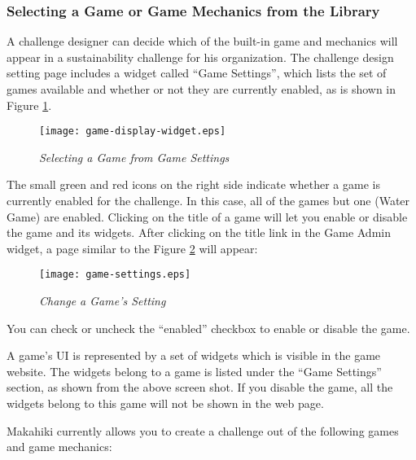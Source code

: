 \subsubsection{Selecting a Game or Game Mechanics from the Library}
A challenge designer can decide which of the built-in game and mechanics will appear in a sustainability challenge for his organization. The challenge design setting page includes a widget called ``Game Settings'', which lists the set of games available and whether or not they are currently enabled, as is shown in Figure \ref{fig:game-display-widget}.

\begin{figure}[!ht]
  \center
  \texttt{[image: game-display-widget.eps]}
  \caption{\em Selecting a Game from Game Settings}
  \label{fig:game-display-widget}
\end{figure}

The small green and red icons on the right side indicate whether a game is currently enabled for the challenge. In this case, all of the games but one (Water Game) are enabled. Clicking on the title of a game will let you enable or disable the game and its widgets. After clicking on the title link in the Game Admin widget, a page similar to the Figure \ref{fig:game-settings} will appear:

\begin{figure}[!ht]
  \center
  \texttt{[image: game-settings.eps]}
  \caption{\em Change a Game's Setting}
  \label{fig:game-settings}
\end{figure}

You can check or uncheck the ``enabled'' checkbox to enable or disable the game.

A game's UI is represented by a set of widgets which is visible in the game website. The widgets belong to a game is listed under the “Game Settings” section, as shown from the above screen shot. If you disable the game, all the widgets belong to this game will not be shown in the web page.

Makahiki currently allows you to create a challenge out of the following games and game mechanics:

